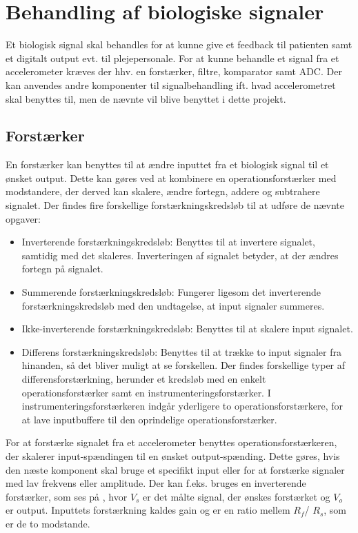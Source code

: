 \section{Behandling af biologiske signaler}
Et biologisk signal skal behandles for at kunne give et feedback til patienten samt et digitalt output evt. til plejepersonale. For at kunne behandle et signal fra et accelerometer kræves der hhv. en forstærker, filtre, komparator samt ADC. Der kan anvendes andre komponenter til signalbehandling ift. hvad accelerometret skal benyttes til, men de nævnte vil blive benyttet i dette projekt. 

\subsection{Forstærker}\label{forstaerkerafsnit}
En forstærker kan benyttes til at ændre inputtet fra et biologisk signal til et ønsket output. Dette kan gøres ved at kombinere en operationsforstærker med modstandere, der derved kan skalere, ændre fortegn, addere og subtrahere signalet. Der findes fire forskellige forstærkningskredsløb til at udføre de nævnte opgaver: \cite{Nilsson2011}
\begin{itemize}
\item Inverterende forstærkningskredsløb: Benyttes til at invertere signalet, samtidig med det skaleres. Inverteringen af signalet betyder, at der ændres fortegn på signalet.
\item Summerende forstærkningskredsløb: Fungerer ligesom det inverterende forstærkningskredsløb med den undtagelse, at input signaler summeres.
\item Ikke-inverterende forstærkningskredsløb: Benyttes til at skalere input signalet.
\item Differens forstærkningskredsløb: Benyttes til at trække to input signaler fra hinanden, så det bliver muligt at se forskellen\cite{Nilsson2011}. Der findes forskellige typer af differensforstærkning, herunder et kredsløb med en enkelt operationsforstærker samt en instrumenteringsforstærker. I instrumenteringsforstærkeren indgår yderligere to operationsforstærkere, for at lave inputbuffere til den oprindelige operationsforstærker.\cite{Sedra2010}  
\end{itemize} 

For at forstærke signalet fra et accelerometer benyttes operationsforstærkeren, der skalerer input-spændingen til en ønsket output-spænding. Dette gøres, hvis den næste komponent skal bruge et specifikt input eller for at forstærke signaler med lav frekvens eller amplitude. Der kan f.eks. bruges en inverterende forstærker, som ses på , hvor $V_{s}$ er det målte signal, der ønskes forstærket og $V_{o}$ er output. Inputtets forstærkning kaldes gain og er en ratio mellem $R_{f}$/ $R_{s}$, som er de to modstande. \cite{Nilsson2011}

